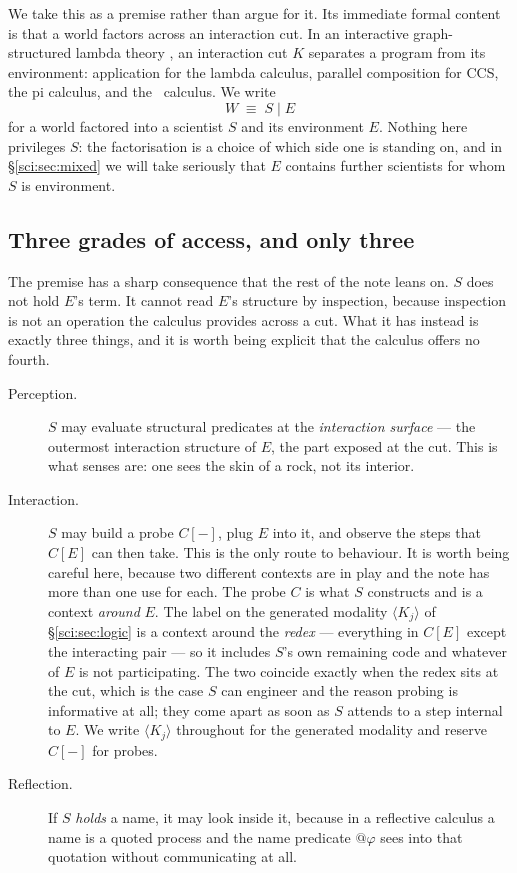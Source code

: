 We take this as a premise rather than argue for it. Its immediate formal content is that a world
factors across an interaction cut. In an interactive graph-structured lambda theory \cite{Omnibus},
an interaction cut $K$ separates a program from its environment: application for the lambda calculus,
parallel composition for CCS, the pi calculus, and the \rhoc\ calculus. We write
\[
W \;\equiv\; S \mid E
\]
for a world factored into a scientist $S$ and its environment $E$. Nothing here privileges $S$: the
factorisation is a choice of which side one is standing on, and in \S\ref{sci:sec:mixed} we will take
seriously that $E$ contains further scientists for whom $S$ is environment.

\subsection{Three grades of access, and only three}\label{sci:S2.2}

The premise has a sharp consequence that the rest of the note leans on. $S$ does not hold $E$'s term.
It cannot read $E$'s structure by inspection, because inspection is not an operation the calculus
provides across a cut. What it has instead is exactly three things, and it is worth being explicit
that the calculus offers no fourth.

\begin{description}
\item[Perception.] $S$ may evaluate structural predicates at the \emph{interaction surface} --- the
outermost interaction structure of $E$, the part exposed at the cut. This is what senses are: one
sees the skin of a rock, not its interior.
\item[Interaction.] $S$ may build a probe $C[-]$, plug $E$ into it, and observe the steps that
$C[E]$ can then take. This is the only route to behaviour. It is worth being careful here, because
two different contexts are in play and the note has more than one use for each. The probe $C$ is
what $S$ constructs and is a context \emph{around} $E$. The label on the generated modality
$\langle K_j \rangle$ of \S\ref{sci:sec:logic} is a context around the \emph{redex} --- everything in
$C[E]$ except the interacting pair --- so it includes $S$'s own remaining code and whatever of $E$
is not participating. The two coincide exactly when the redex sits at the cut, which is the case
$S$ can engineer and the reason probing is informative at all; they come apart as soon as $S$
attends to a step internal to $E$. We write $\langle K_j \rangle$ throughout for the generated
modality and reserve $C[-]$ for probes.
\item[Reflection.] If $S$ \emph{holds} a name, it may look inside it, because in a reflective calculus
a name is a quoted process and the name predicate $@\varphi$ sees into that quotation without
communicating at all.
\end{description}

